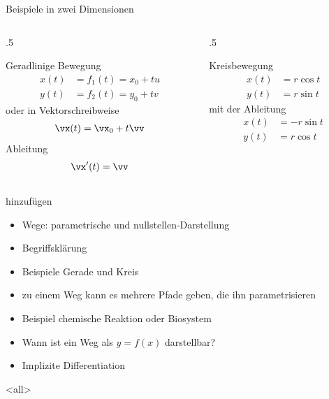 \begin{frame}{Beispiele in zwei Dimensionen}
    \begin{columns}
        \begin{column}{.5\textwidth}
        \begin{block}{Geradlinige Bewegung}
            \begin{align*}
                x(t) &= f_1(t) = x_0 + t u\\
                y(t) &= f_2(t) = y_0+tv
            \end{align*}
            oder in Vektorschreibweise
            \begin{gather*}
                \vx(t) = \vx_0+t\vv
            \end{gather*}
            Ableitung
            \begin{gather*}
                \vx'(t) = \vv
            \end{gather*}
        \end{block}         
        \end{column}
        \pause
        \begin{column}{.5\textwidth}
        \begin{block}{Kreisbewegung}
            \begin{align*}
                x(t) &= r \cos t\\
                y(t) &= r \sin t
            \end{align*}
            mit der Ableitung
            \begin{align*}
                x(t) &= -r \sin t\\
                y(t) &= r \cos t
            \end{align*}
        \end{block}         
        \end{column}
    \end{columns}
\end{frame}



\begin{envgknote}{hinzufügen}
   \begin{itemize}
       \item Wege: parametrische und nullstellen-Darstellung
       \item Begriffsklärung
       \item Beispiele Gerade und Kreis
       \item zu einem Weg kann es mehrere Pfade geben, die ihn parametrisieren
       \item Beispiel chemische Reaktion oder Biosystem
       \item Wann ist ein Weg als $y=f(x)$ darstellbar?
       \item Implizite Differentiation
   \end{itemize} 
\end{envgknote}
\mode<all>
